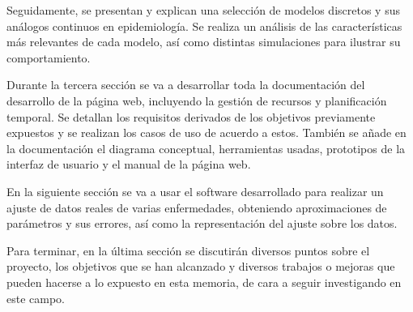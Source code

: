 Seguidamente, se presentan y explican una selección de modelos discretos y sus análogos continuos en epidemiología. Se realiza un análisis de las características más relevantes de cada modelo, así como distintas simulaciones para ilustrar su comportamiento. 

Durante la tercera sección se va a desarrollar toda la documentación del desarrollo de la página web, incluyendo la gestión de recursos y planificación temporal. Se detallan los requisitos derivados de los objetivos previamente expuestos y se realizan los casos de uso de acuerdo a estos. También se añade en la documentación el diagrama conceptual, herramientas usadas, prototipos de la interfaz de usuario y el manual de la página web.

En la siguiente sección se va a usar el software desarrollado para realizar un ajuste de datos reales de varias enfermedades, obteniendo aproximaciones de parámetros y sus errores, así como la representación del ajuste sobre los datos.

Para terminar, en la última sección se discutirán diversos puntos sobre el proyecto, los objetivos que se han alcanzado y diversos trabajos o mejoras que pueden hacerse a lo expuesto en esta memoria, de cara a seguir investigando en este campo.


